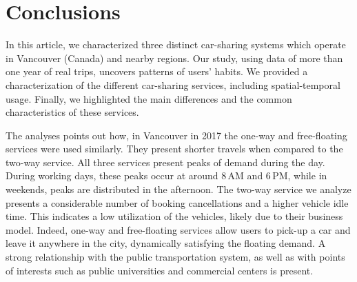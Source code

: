 \section{Conclusions} 
\label{sec:4_6_conclusion}

In this article, we characterized three distinct car-sharing systems which operate in  Vancouver  (Canada)  and nearby regions. Our study, using data of more than one year of real trips, uncovers patterns of users’ habits.  We provided a characterization of the different car-sharing services, including spatial-temporal usage. Finally, we highlighted the main differences and the common characteristics of these services.

The analyses points out how, in Vancouver in 2017 the one-way and free-floating services were used similarly. They present shorter travels when compared to the two-way service. All three services present peaks of demand during the day. During working days, these peaks occur at around 8\,AM and 6\,PM, while in weekends, peaks are distributed in the afternoon. The two-way service we analyze presents a considerable number of booking cancellations and a higher vehicle idle time. This indicates a low utilization of the vehicles, likely due to their business model. Indeed, one-way and free-floating services allow users to pick-up a car and leave it anywhere in the city, dynamically satisfying the floating demand. 
A strong relationship with the public transportation system, as well as with points of interests such as public universities and commercial centers is present. 